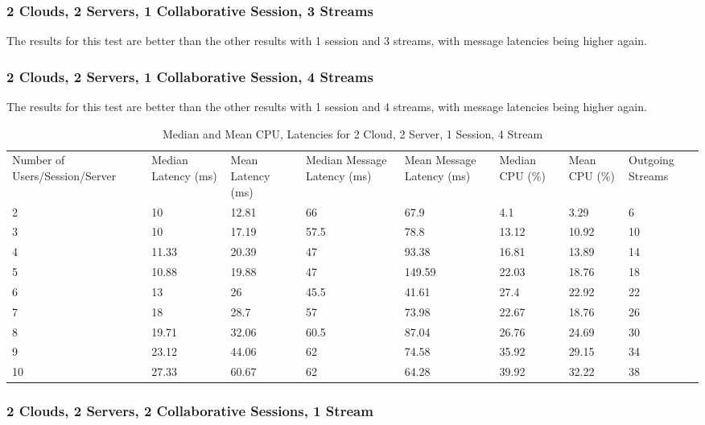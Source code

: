 \subsubsection{2 Clouds, 2 Servers, 1 Collaborative Session, 3 Streams}

The results for this test are better than the other results with 1 session and 3 streams, with message latencies being higher again.

\subsubsection{2 Clouds, 2 Servers, 1 Collaborative Session, 4 Streams}

The results for this test are better than the other results with 1 session and 4 streams, with message latencies being higher again.

\begin{table}
\caption{Median and Mean CPU, Latencies for 2 Cloud, 2 Server, 1 Session, 4 Stream}
\label{table:2cld_2serv_1sess_4str}
\begin{tabu} to\linewidth{|X[c]|X[c]|X[c]|X[c]|X[c]|X[c]|X[c]|X[c]|}
\everyrow{\hline}
\hline
Number of Users/Session/Server & Median Latency (ms) & Mean Latency (ms) & Median Message Latency (ms) & Mean Message Latency (ms) & Median CPU (\%) & Mean CPU (\%) & Outgoing Streams\\
2 & 10 & 12.81 & 66 & 67.9 & 4.1 & 3.29 & 6 \\
3 & 10 & 17.19 & 57.5 & 78.8 & 13.12 & 10.92 & 10 \\
4 & 11.33 & 20.39 & 47 & 93.38 & 16.81 & 13.89 & 14 \\
5 & 10.88 & 19.88 & 47 & 149.59 & 22.03 & 18.76 & 18 \\
6 & 13 & 26 & 45.5 & 41.61 & 27.4 & 22.92 & 22 \\
7 & 18 & 28.7 & 57 & 73.98 & 22.67 & 18.76 & 26 \\
8 & 19.71 & 32.06 & 60.5 & 87.04 & 26.76 & 24.69 & 30 \\
9 & 23.12 & 44.06 & 62 & 74.58 & 35.92 & 29.15 & 34 \\
10 & 27.33 & 60.67 & 62 & 64.28 & 39.92 & 32.22 & 38 \\
\end{tabu}
\end{table}

\clearpage\subsubsection{2 Clouds, 2 Servers, 2 Collaborative Sessions, 1 Stream}

